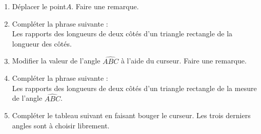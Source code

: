 \begin{changemargin}{-10mm}{-10mm}
\begin{activite}
\begin{center}
        \end{center}
        \begin{enumerate}
            \item Déplacer le point$A$. Faire une remarque.
            \par\medskip
            \pointilles\par\medskip
            \pointilles\par\medskip
            \pointilles\par\medskip
            \pointilles
            \item Compléter la phrase suivante :\\
            Les rapports des longueurs de deux côtés d'un triangle rectangle \pointilles[0.3\linewidth] de la longueur des côtés.
            \item Modifier la valeur de l'angle $\widehat{ABC}$ à l'aide du curseur. Faire une remarque.
            \par\medskip
            \pointilles\par\medskip
            \pointilles\par\medskip
            \pointilles\par\medskip
            \pointilles\par\medskip        
            \item Compléter la phrase suivante :\\
            Les rapports des longueurs de deux côtés d'un triangle rectangle \pointilles[0.3\linewidth] de la mesure de l'angle $\widehat{ABC}$.
        \end{enumerate}
    
        \clearpage
        \begin{enumerate}
            \setcounter{enumi}{4}
            \item Compléter le tableau suivant en faisant bouger le curseur. Les trois derniers angles sont à choisir librement.
            

\end{enumerate}
\end{activite}
\end{changemargin}
